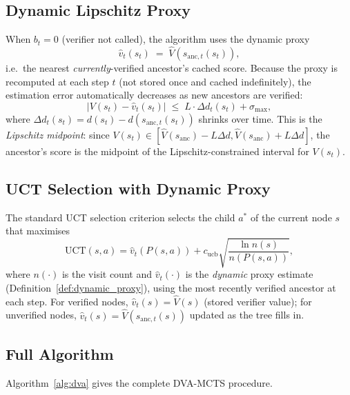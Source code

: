 \subsection{Dynamic Lipschitz Proxy}

When $b_t = 0$ (verifier not called), the algorithm uses the dynamic proxy
\[
  \hat{v}_t(s_t) \;=\; \hat{V}(s_{\mathrm{anc},t}(s_t)),
\]
i.e.\ the nearest \emph{currently}-verified ancestor's cached score.
Because the proxy is recomputed at each step $t$ (not stored once and cached
indefinitely), the estimation error automatically decreases as new ancestors
are verified:
\[
  |V(s_t) - \hat{v}_t(s_t)|
  \;\leq\; L \cdot \Delta d_t(s_t) + \sigma_{\max},
\]
where $\Delta d_t(s_t) = d(s_t) - d(s_{\mathrm{anc},t}(s_t))$ shrinks over time.
This is the \emph{Lipschitz midpoint}: since $V(s_t) \in [\hat{V}(s_{\mathrm{anc}}) - L\Delta d,
\hat{V}(s_{\mathrm{anc}}) + L\Delta d]$, the ancestor's score is the midpoint of the
Lipschitz-constrained interval for $V(s_t)$.

\subsection{UCT Selection with Dynamic Proxy}

The standard UCT selection criterion \citep{kocsis2006bandit} selects the child $a^*$
of the current node $s$ that maximises
\[
  \text{UCT}(s, a) = \hat{v}_t(P(s,a)) + c_{\text{ucb}} \sqrt{\frac{\ln n(s)}{n(P(s,a))}},
\]
where $n(\cdot)$ is the visit count and $\hat{v}_t(\cdot)$ is the \emph{dynamic}
proxy estimate (Definition~\ref{def:dynamic_proxy}), using the most recently verified
ancestor at each step.  For verified nodes, $\hat{v}_t(s) = \hat{V}(s)$ (stored
verifier value); for unverified nodes, $\hat{v}_t(s) = \hat{V}(s_{\mathrm{anc},t}(s))$
updated as the tree fills in.

\subsection{Full Algorithm}

Algorithm~\ref{alg:dva} gives the complete DVA-MCTS procedure.

